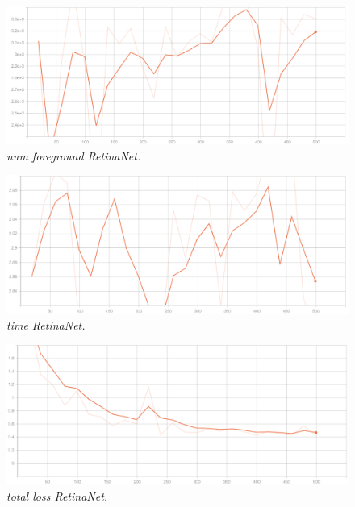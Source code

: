 \begin{figure}[h!]
\begin{center} 
\includegraphics[scale=0.35]{figures/num_foreground_6}
\caption{\small \sl num foreground RetinaNet. \label{fig:num_foreground}}
\end{center}
\end{figure}

\begin{figure}[h!]
\begin{center} 
\includegraphics[scale=0.35]{figures/time_retinanet_7}
\caption{\small \sl time RetinaNet. \label{fig:time_retinanet}}
\end{center}
\end{figure}

\begin{figure}[h!]
\begin{center} 
\includegraphics[scale=0.35]{figures/total_loss_retinanet_8}
\caption{\small \sl total loss RetinaNet. \label{fig:total_loss_retinanet}}
\end{center}
\end{figure}

